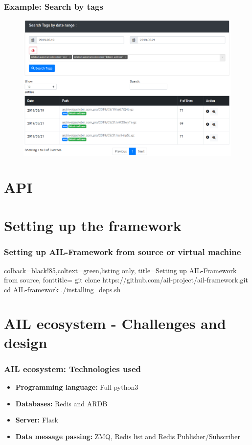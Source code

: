\documentclass{beamer}
\begin{document}
\begin{frame}
    \frametitle{Example: Search by tags}
    \begin{figure}
        \includegraphics[scale=0.26, angle=0]{images/ail_14.png}
    \end{figure}
\end{frame}

\section{API}


\section{Setting up the framework}
\lstset{style=bash}
\begin{frame}[fragile]
    \frametitle{Setting up AIL-Framework from source or virtual machine}
    \begin{tcblisting}{colback=black!85,coltext=green,listing only,
        title=Setting up AIL-Framework from source, fonttitle=\bfseries}
git clone https://github.com/ail-project/ail-framework.git
cd AIL-framework
./installing_deps.sh
\end{tcblisting}
\end{frame}

\section{AIL ecosystem - Challenges and design}
\begin{frame}
    \frametitle{AIL ecosystem: Technologies used}
    \begin{itemize}
        \item[] \textbf{Programming language:} Full python3
        \item[] \textbf{Databases:} Redis and ARDB
        \item[] \textbf{Server:} Flask
        \item[] \textbf{Data message passing:} ZMQ, Redis list and Redis Publisher/Subscriber
    \end{itemize}
\end{frame}
\end{document}

